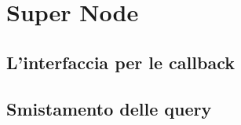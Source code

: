 \chapter{Super Node}
\section{L'interfaccia per le callback}
\section{Smistamento delle query}\label{sec:smistamento_delle_query}